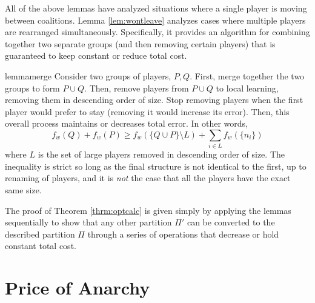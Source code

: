 \documentclass{article}
\newcommand{\ndraw}[0]{\ensuremath{n}}
\newcommand{\costw}[0]{\ensuremath{f_w}}
\newcommand{\partition}[0]{\ensuremath{\Pi}}
\begin{document}
All of the above lemmas have analyzed situations where a single player is moving between coalitions. Lemma \ref{lem:wontleave} analyzes cases where multiple players are rearranged simultaneously. Specifically, it provides an algorithm for combining together two separate groups (and then removing certain players) that is guaranteed to keep constant or reduce total cost.

\begin{restatable}[Merging]{lemma}{merge}
\label{lem:merge}
Consider two groups of players, $P, Q$. First, merge together the two groups to form $P \cup Q$. Then, remove players from $P\cup Q$ to local learning, removing them in descending order of size. Stop removing players when the first player would prefer to stay (removing it would increase its error). Then, this overall process maintains or decreases total error. 
In other words, 
\begin{equation}\label{eq:submod0}
\costw(Q) + \costw(P) \geq \costw(\{Q\cup P\}\setminus L) + \sum_{i \in L}\costw(\{\ndraw_i\})
\end{equation}
where $L$ is the set of large players removed in descending order of size. The inequality is strict so long as the final structure is not identical to the first, up to renaming of players, and it is \emph{not} the case that all the players have the exact same size. 
\end{restatable}

The proof of Theorem \ref{thrm:optcalc} is given simply by applying the lemmas sequentially to show that any other partition $\partition'$ can be converted to the described partition $\partition$ through a series of operations that decrease or hold constant total cost. 

\section{Price of Anarchy}\label{sec:PoA}
\end{document}

